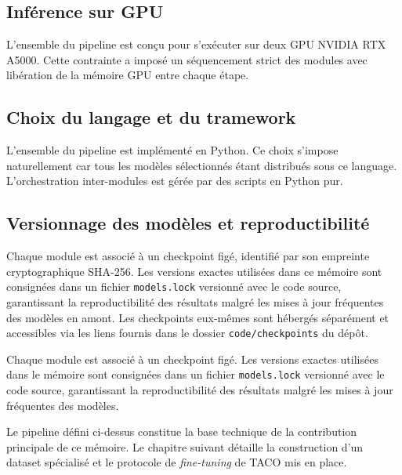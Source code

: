 \subsection{Inférence sur GPU} \label{sec:inference-sur-GPU}

L'ensemble du pipeline est conçu pour s'exécuter sur deux GPU NVIDIA RTX A5000. Cette contrainte a imposé un séquencement strict des modules avec libération de la mémoire GPU entre chaque étape.

\subsection{Choix du langage et du tramework}

L'ensemble du pipeline est implémenté en Python. Ce choix s'impose naturellement car tous les modèles sélectionnés étant distribués sous ce language. L'orchestration inter-modules est gérée par des scripts en Python pur.

\subsection{Versionnage des modèles et reproductibilité}

Chaque module est associé à un checkpoint figé, identifié par son empreinte cryptographique SHA-256. Les versions exactes utilisées dans ce mémoire sont consignées dans un fichier \texttt{models.lock} versionné avec le code source, garantissant la reproductibilité des résultats malgré les mises à jour fréquentes des modèles en amont. Les checkpoints eux-mêmes sont hébergés séparément et accessibles via les liens fournis dans le dossier \texttt{code/checkpoints} du dépôt.

Chaque module est associé à un checkpoint figé. Les versions exactes utilisées dans le mémoire sont consignées dans un fichier \texttt{models.lock} versionné avec le code source, garantissant la reproductibilité des résultats malgré les mises à jour fréquentes des modèles.

\medskip
Le pipeline défini ci-dessus constitue la base technique de la contribution principale de ce mémoire. Le chapitre suivant détaille la construction d'un dataset spécialisé et le protocole de \emph{fine-tuning} de TACO mis en place.